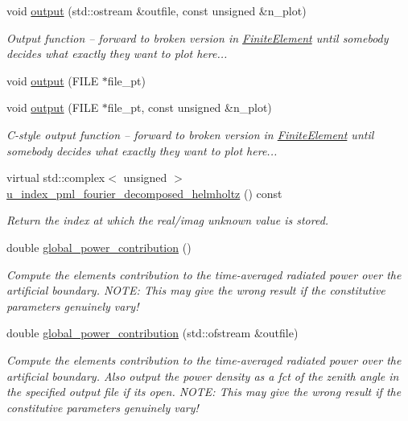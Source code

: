 \begin{DoxyCompactItemize}
\item 
void \hyperlink{classoomph_1_1PMLFourierDecomposedHelmholtzPowerMonitorElement_a69d1d0e4362c38aa9e6f258af37f0bf4}{output} (std\+::ostream \&outfile, const unsigned \&n\+\_\+plot)
\begin{DoxyCompactList}\small\item\em Output function -- forward to broken version in \hyperlink{classoomph_1_1FiniteElement}{Finite\+Element} until somebody decides what exactly they want to plot here... \end{DoxyCompactList}\item 
void \hyperlink{classoomph_1_1PMLFourierDecomposedHelmholtzPowerMonitorElement_a41e6fd4956dd28d122e852ce6952746a}{output} (F\+I\+LE $\ast$file\+\_\+pt)
\item 
void \hyperlink{classoomph_1_1PMLFourierDecomposedHelmholtzPowerMonitorElement_a53af82940246d4674642d22ff92735d5}{output} (F\+I\+LE $\ast$file\+\_\+pt, const unsigned \&n\+\_\+plot)
\begin{DoxyCompactList}\small\item\em C-\/style output function -- forward to broken version in \hyperlink{classoomph_1_1FiniteElement}{Finite\+Element} until somebody decides what exactly they want to plot here... \end{DoxyCompactList}\item 
virtual std\+::complex$<$ unsigned $>$ \hyperlink{classoomph_1_1PMLFourierDecomposedHelmholtzPowerMonitorElement_ab3b95be5191af9524a4f049d9db413be}{u\+\_\+index\+\_\+pml\+\_\+fourier\+\_\+decomposed\+\_\+helmholtz} () const
\begin{DoxyCompactList}\small\item\em Return the index at which the real/imag unknown value is stored. \end{DoxyCompactList}\item 
double \hyperlink{classoomph_1_1PMLFourierDecomposedHelmholtzPowerMonitorElement_ae5bf09c4c5b8d9cf9439f57fc800262c}{global\+\_\+power\+\_\+contribution} ()
\begin{DoxyCompactList}\small\item\em Compute the element\textquotesingle{}s contribution to the time-\/averaged radiated power over the artificial boundary. N\+O\+TE\+: This may give the wrong result if the constitutive parameters genuinely vary! \end{DoxyCompactList}\item 
double \hyperlink{classoomph_1_1PMLFourierDecomposedHelmholtzPowerMonitorElement_a87edcf6c7adc8de31c1054e15f3d8a9b}{global\+\_\+power\+\_\+contribution} (std\+::ofstream \&outfile)
\begin{DoxyCompactList}\small\item\em Compute the element\textquotesingle{}s contribution to the time-\/averaged radiated power over the artificial boundary. Also output the power density as a fct of the zenith angle in the specified output file if it\textquotesingle{}s open. N\+O\+TE\+: This may give the wrong result if the constitutive parameters genuinely vary! \end{DoxyCompactList}\end{DoxyCompactItemize}
